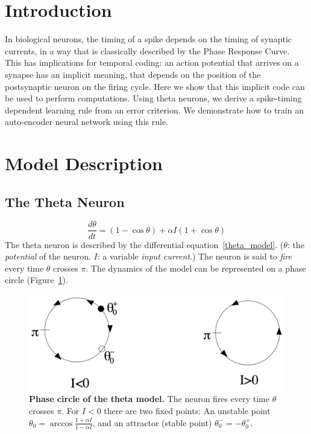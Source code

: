 \documentclass[final]{beamer}
\title
[Neural and Cognitive Computation Poster Session, Dec 30, Xuetang 117]
{ %
Temporal Coding using the Response Properties of Spiking Neurons
}
\author{ %
[Team 17] Guosai Wang, Han Shen
}
\institute%
{
Institute for Interdisciplinary Information Sciences, Tsinghua University
}
\date{\today}
\begin{document}
\begin{frame}[t]
\begin{multicols}{2}

\section{Introduction}


In biological neurons, the timing of a spike depends on the timing of synaptic currents, in a way that is classically described by the Phase Response Curve. This has implications for temporal coding: an action potential that arrives on a synapse has an implicit meaning, that depends on the position of the postsynaptic neuron on the firing cycle. Here we show that this implicit code can be used to perform computations. Using theta neurons, we derive a spike-timing dependent learning rule from an error criterion. We demonstrate how to train an auto-encoder neural network using this rule.

\section{Model Description}

\subsection{The Theta Neuron}

\begin{equation}
\label{theta_model}
	\frac{d\theta}{dt} = (1-\cos \theta) + \alpha I (1 + \cos \theta)
\end{equation}
The theta neuron is described by the differential equation~\ref{theta_model}.
($\theta$: the \emph{potential} of the neuron. $I$: a variable \emph{input current}.)
The neuron is said to \emph{fire} every time $\theta$ crosses $\pi$.
The dynamics of the model can be represented on a phase circle (Figure~\ref{phase_circle}).

\begin{figure}
\centering
\includegraphics[width=0.6\columnwidth]{phase_circle}
\caption{
\textbf{Phase circle of the theta model.}
The neuron fires every time $\theta$ crosses $\pi$.
For $I < 0$ there are two fixed points: An unstable point $\theta_0 = \arccos\frac{1 + \alpha I}{1-\alpha I}$,
and an attractor (stable point) $\theta_0^- = -\theta_0^+$.}
\label{phase_circle}
\end{figure}


\end{multicols}
\end{frame}
\end{document}
